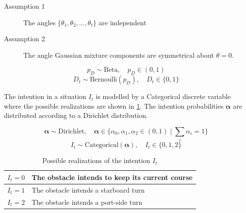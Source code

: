 \begin{description}
    \item[Assumption 1] The angles $\{\theta_1, \theta_2, \dots, \theta_t\}$ are independent
    \item[Assumption 2] The angle Gaussian mixture components are symmetrical about $\theta=0$. 
\end{description}

\begin{equation}
    p_D \sim \text{Beta}, \quad p_D \in (0, 1)
\end{equation}
\begin{equation}
    D_t \sim \text{Bernoulli}(p_D), \quad D_t \in \{0, 1\}
\end{equation}

The intention in a situation $I_t$ is modelled by a Categorical discrete variable where the possible realizations are shown in \cref{tbl:intentions}. The intention probabilities $\boldsymbol{\alpha}$ are distributed according to a Dirichlet distribution.

\begin{equation}
    \boldsymbol{\alpha} \sim \text{Dirichlet}, \quad \boldsymbol{\alpha} \in \{\alpha_0, \alpha_1, \alpha_2 \in (0, 1) \; | \; \sum_i \alpha_i = 1 \}
\end{equation}
\begin{equation}
    I_t \sim \text{Categorical}(\boldsymbol{\alpha}), \quad I_t \in \{0, 1, 2\}
\end{equation}

\begin{table}[h]
\centering
\begin{tabular}{|l|l|}
\hline
$I_t=0$ & The obstacle intends to keep its current course \\ \hline
$I_t=1$ & The obstacle intends a starboard turn           \\ \hline
$I_t=2$ & The obstacle intends a port-side turn            \\ \hline
\end{tabular}
\caption{Possible realizations of the intention $I_t$}
\label{tbl:intentions}
\end{table}


